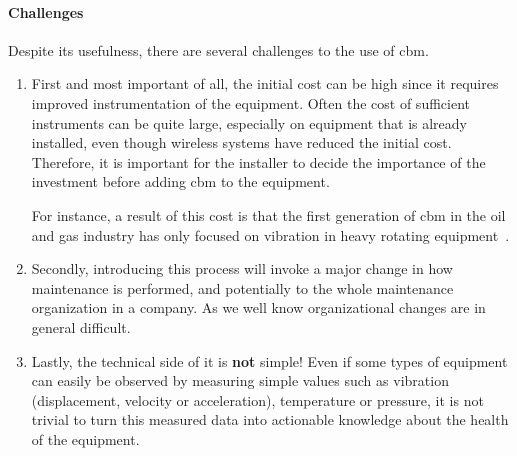 \paragraph{Challenges}
Despite its usefulness, there are several challenges to the use of \acl{cbm}.
\begin{enumerate}
    \item First and most important of all, the initial cost can be high since it requires improved instrumentation of the equipment.
    Often the cost of sufficient instruments can be quite large, especially on equipment that is already installed, even though
    wireless systems have reduced the initial cost. Therefore, it is important for the installer to decide the importance of the investment before adding \ac*{cbm} to the equipment.

    For instance, a result of this cost is that the first generation of \ac*{cbm} in the oil and gas industry has only focused on vibration in heavy rotating equipment~\cite{Misc:dida_2020_manufacturing}.
    \item Secondly, introducing this process will invoke a major change in how maintenance is performed, and potentially to the whole maintenance organization in a company.
    As we well know organizational changes are in general difficult.
    \item Lastly, the technical side of it is \textbf{not} simple! Even if some types of equipment can easily be observed by measuring simple
    values such as vibration (displacement, velocity or acceleration), temperature or pressure, it is not trivial to turn this measured data
    into actionable knowledge about the health of the equipment.
\end{enumerate}

